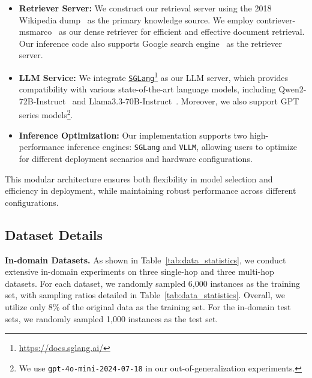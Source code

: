 \begin{itemize}[topsep=1pt, partopsep=1pt, leftmargin=12pt, itemsep=-1pt]
    \item \textbf{Retriever Server:} We construct our retrieval server using the 2018 Wikipedia dump~\citep{yang-etal-2018-hotpotqa} as the primary knowledge source. We employ contriever-msmarco~\citep{IzacardCHRBJG22} as our dense retriever for efficient and effective document retrieval. Our inference code also supports Google search engine~\citep{schmidt2014google} as the retriever server.
    
    \item \textbf{LLM Service:} We integrate \href{https://docs.sglang.ai/}{\texttt{SGLang}}\footnote{\url{https://docs.sglang.ai/}} as our LLM server, which provides compatibility with various state-of-the-art language models, including Qwen2-72B-Instruct~\citep{qwen2} and Llama3.3-70B-Instruct~\citep{llama3}. Moreover, we also support GPT series models\footnote{We use \texttt{gpt-4o-mini-2024-07-18} in our out-of-generalization experiments.}.
    
    \item \textbf{Inference Optimization:} Our implementation supports two high-performance inference engines: \texttt{SGLang} and \texttt{VLLM}, allowing users to optimize for different deployment scenarios and hardware configurations.
\end{itemize}

This modular architecture ensures both flexibility in model selection and efficiency in deployment, while maintaining robust performance across different configurations.



\subsection{Dataset Details}

\textbf{In-domain Datasets.}
As shown in Table~\ref{tab:data_statistics}, we conduct extensive in-domain experiments on three single-hop and three multi-hop datasets.
For each dataset, we randomly sampled 6,000 instances as the training set, with sampling ratios detailed in Table~\ref{tab:data_statistics}. Overall, we utilize only 8\% of the original data as the training set.
For the in-domain test sets, we randomly sampled 1,000 instances as the test set.



